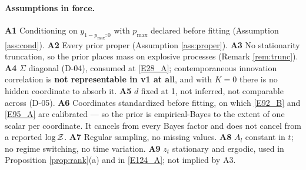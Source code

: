 \paragraph{Assumptions in force.} \textbf{A1} Conditioning on $y_{1-p_{\max}:0}$ with
$p_{\max}$ declared before fitting (Assumption \ref{ass:cond}). \textbf{A2} Every
prior proper (Assumption \ref{ass:proper}). \textbf{A3} No stationarity truncation,
so the prior places mass on explosive processes (Remark \ref{rem:trunc}).
\textbf{A4} $\Sigma$ diagonal (D-04), consumed at \eqref{E28_A}; contemporaneous
innovation correlation is \textbf{not representable in v1 at all}, and with $K=0$
there is no hidden coordinate to absorb it. \textbf{A5} $d$ fixed at 1, not inferred,
not comparable across (D-05). \textbf{A6} Coordinates standardized before fitting, on
which \eqref{E92_B} and \eqref{E95_A} are calibrated --- so the prior is empirical-Bayes
to the extent of one scalar per coordinate. It cancels from every Bayes factor and
does not cancel from a reported $\log\mathcal{Z}$. \textbf{A7} Regular sampling, no missing
values. \textbf{A8} $A_l$ constant in $t$; no regime switching, no time variation.
\textbf{A9} $z_t$ stationary and ergodic, used in Proposition \ref{prop:rank}(a) and
in \eqref{E124_A}; not implied by A3.


